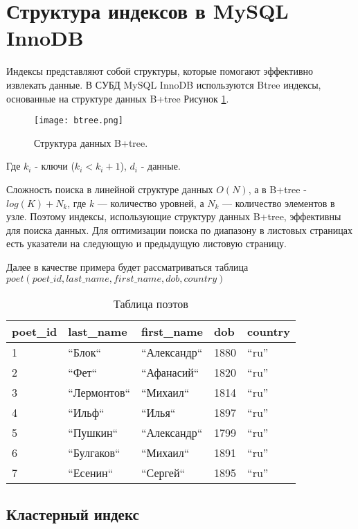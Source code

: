 \section{Структура индексов в MySQL InnoDB}

Индексы представляют собой структуры, которые помогают эффективно извлекать данные.
В СУБД MySQL InnoDB используются Btree индексы, основанные на структуре данных B+tree Рисунок \ref{img:btree-structure}.

\begin{figure}[H]
  \centering
  \texttt{[image: btree.png]}
  \caption{Структура данных B+tree.}
  \label{img:btree-structure}
\end{figure}

Где
$k_i$ - ключи ($k_i < k_i + 1$),
$d_i$ - данные.

Сложность поиска в линейной структуре данных $O(N)$, а в B+tree - $log(K)+N_k$, где $k$ — количество уровней, а $N_k$ — количество элементов в узле. Поэтому индексы, использующие структуру данных B+tree, эффективны для поиска данных. Для оптимизации поиска по диапазону в листовых страницах есть указатели на следующую и предыдущую листовую страницу.

Далее в качестве примера будет рассматриваться таблица $poet (poet\_id, last\_name, first\_name, dob, country)$

\begin{table}[h]
\caption{Таблица поэтов}
\medskip
\begin{tabular}{|l|l|l|l|l|}
\hline
poet\_id & last\_name & first\_name & dob & country\\
\hline
1 & “Блок“ & “Александр“ & 1880 & “ru”\\
2 & “Фет“ & “Афанасий“ & 1820 & “ru”\\
3 & “Лермонтов“ & “Михаил“ & 1814 & “ru”\\
4 & “Ильф“ & “Илья“ & 1897 & “ru”\\
5 & “Пушкин“ & “Александр“ & 1799 & “ru”\\
6 & “Булгаков“ & “Михаил“ & 1891 & “ru”\\
7 & “Есенин“ & “Сергей“ & 1895 & “ru”\\
\hline
\end{tabular}
\end{table}

\subsection{Кластерный индекс}

